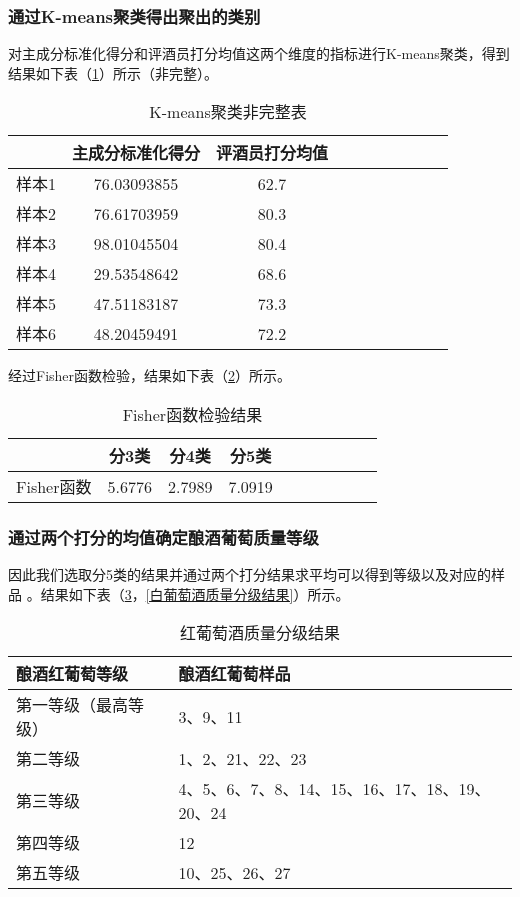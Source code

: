 \documentclass[withoutpreface,bwprint]{cumcmthesis} %
\begin{document}
\subsubsection{通过K-means聚类得出聚出的类别}
对主成分标准化得分和评酒员打分均值这两个维度的指标进行K-means聚类，得到结果如下表（\ref{K-means聚类非完整表}）所示（非完整）。
\begin{table}[!htbp]
\centering
\caption{K-means聚类非完整表}
\label{K-means聚类非完整表}
\begin{tabular}{cccccccccc}
\toprule
 &主成分标准化得分&评酒员打分均值\\
\midrule
样本1&76.03093855&62.7\\
样本2&76.61703959&80.3\\
样本3&98.01045504&80.4\\
样本4&29.53548642&68.6\\
样本5&47.51183187&73.3\\
样本6&48.20459491&72.2\\
\bottomrule 
\end{tabular}
\end{table}

\par 经过Fisher函数检验，结果如下表（\ref{Fisher函数检验}）所示。
\begin{table}[!htbp]
\centering
\caption{Fisher函数检验结果}
\label{Fisher函数检验}
\begin{tabular}{cccccccccc}
\toprule
 &分3类&分4类&分5类\\
\midrule
Fisher函数&5.6776&2.7989&7.0919\\
\bottomrule 
\end{tabular}
\end{table}

\subsubsection{通过两个打分的均值确定酿酒葡萄质量等级}
因此我们选取分5类的结果并通过两个打分结果求平均可以得到等级以及对应的样品
。结果如下表（\ref{红葡萄酒质量分级结果}，\ref{白葡萄酒质量分级结果}）所示。
\begin{table}[!htbp]
\centering
\caption{红葡萄酒质量分级结果}
\label{红葡萄酒质量分级结果}
\begin{tabular}{ll}
\toprule
 酿酒红葡萄等级&酿酒红葡萄样品\\
\midrule
第一等级（最高等级）&3、9、11\\
第二等级&1、2、21、22、23\\
第三等级&4、5、6、7、8、14、15、16、17、18、19、20、24\\
第四等级&12\\
第五等级&10、25、26、27\\
\bottomrule 
\end{tabular}
\end{table}
\end{document}

